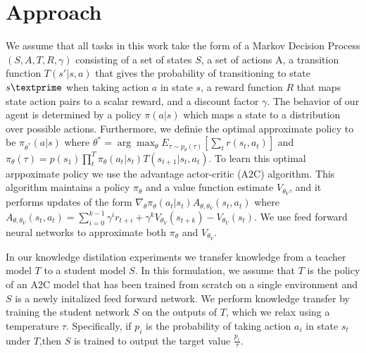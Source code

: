 \section{Approach}
We assume that all tasks in this work take the form of a Markov Decision Process $(S, A, T, R, \gamma)$ consisting of
a set of states $S$, a set of actions A, a transition function $T(s' \vert s, a)$ that gives the
probability of transitioning to state $s \textprime$ when taking action $a$ in state $s$, a reward function
$R$ that maps state action pairs to a scalar reward, and a discount factor $\gamma$. The behavior of our
agent is determined by a policy $\pi(a \vert s)$ which maps a state to a distribution over possible actions.
Furthermore, we definie the optimal approximate policy to be $\pi_{\theta^*}(a \vert s)$ where
$\theta^* = \arg\max_{\theta} E_{\tau \sim p_\theta(\tau)}[\sum_t r(s_t, a_t)]$ and
$\pi_\theta(\tau) = p(s_1) \prod_t^T \pi_\theta(a_t \vert s_t)T(s_{t+1} \vert s_t, a_t)$.
To learn this optimal arppoximate policy we use the advantage actor-critic (A2C) algorithm.
This algorithm maintains a policy $\pi_\theta$ and a value function estimate $V_{\theta_V}$,
and it performs updates of the form $\nabla_\theta \pi_\theta(a_t \vert s_t)A_{\theta, \theta_V}(s_t, a_t)$
where $A_{\theta, \theta_V}(s_t, a_t) = \sum_{i=0}^{k-1} \gamma^ir_{t+i} + \gamma^kV_{\theta_V}(s_{t+k}) - V_{\theta_V}(s_t)$.
We use feed forward neural networks to approximate both $\pi_\theta$ and $V_{\theta_V}$.

In our knowledge distilation experiments we transfer knowledge from a teacher model $T$ to a
student model $S$. In this formulation, we assume that $T$ is the policy of an A2C model that
has been trained from scratch on a single environment and $S$ is a newly initalized feed forward network. 
We perform knowledge transfer by training the student network $S$ on the outputs of $T$, 
which we relax using a temperature $\tau$. Specifically, if $p_i$ is the probability of taking action 
$a_i$ in state $s_t$ under $T$,then $S$ is trained to output the target value $\frac{p_i}{\tau}$.

